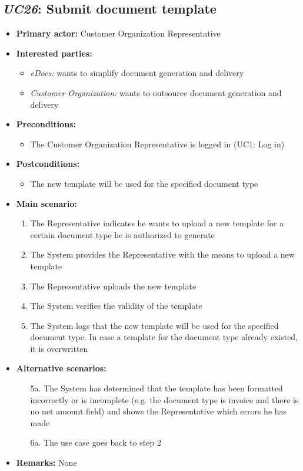 \documentclass[a4paper,10pt]{article}
\begin{document}
\subsection{\emph{UC26}: Submit document template}
\begin{itemize}
	\item \textbf{Primary actor:} Customer Organization Representative
	\item \textbf{Interested parties:} 
	\begin{itemize}
		\item \textit{eDocs:} wants to simplify document generation and delivery
		\item \textit{Customer Organization:} wants to outsource document generation and delivery
	\end{itemize}
	
	\item \textbf{Preconditions:}
	\begin{itemize}
		\item The Customer Organization Representative is logged in (UC1: Log in)
	\end{itemize}
	
	\item \textbf{Postconditions:}
	\begin{itemize}
		\item The new template will be used for the specified document type
	\end{itemize}
	
	\item \textbf{Main scenario:} 
	\begin{enumerate}
		\item The Representative indicates he wants to upload a new template for a certain document type he is authorized to generate
		\item The System provides the Representative with the means to upload a new template
		\item The Representative uploads the new template
		\item The System verifies the validity of the template
		\item The System logs that the new template will be used for the specified document type. In case a template for the document type already existed, it is overwritten
	\end{enumerate}
	
	\item \textbf{Alternative scenarios:} 
	\begin{enumerate}
		\item [5a.] The System has determined that the template has been formatted incorrectly or is incomplete (e.g. the document type is invoice and there is no net amount field) and shows the Representative which errors he has made
		\item [6a.] The use case goes back to step 2
	\end{enumerate}
	
	\item \textbf{Remarks:}
	None
\end{itemize}
\end{document}
